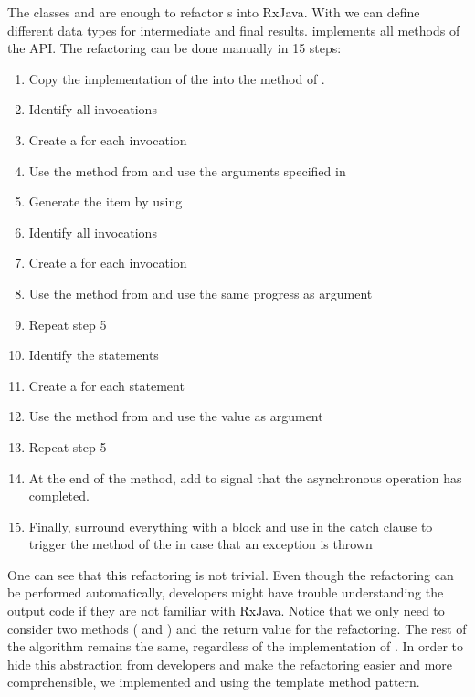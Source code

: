 \documentclass[type=bsc,accentcolor=tud9c]{tudthesis}
\newcommand{\framework}[1]{\textcolor{black}{#1}}
\begin{document}
The classes  and  are enough to refactor s into \framework{RxJava}. With  we can define different data types for intermediate and final results.  implements all methods of the  API. The refactoring can be done manually in 15 steps:
\begin{enumerate}
	\item Copy the  implementation of the  into the  method of .
	\item Identify all  invocations
	\item Create a  for each  invocation
	\item Use the method  from  and use the arguments specified in 
	\item Generate the item by using 
	\item Identify all  invocations
	\item Create a  for each  invocation
	\item Use the method  from  and use the same progress as argument
	\item Repeat step 5
	\item Identify the  statements
	\item Create a  for each  statement
	\item Use the method  from  and use the  value as argument
	\item Repeat step 5
	\item At the end of the  method, add  to signal that the asynchronous operation has completed.
	\item Finally, surround everything with a  block and use  in the catch clause to trigger the  method of the  in case that an exception is thrown
\end{enumerate}

One can see that this refactoring is not trivial. Even though the refactoring can be performed automatically, developers might have trouble understanding the output code if they are not familiar with \framework{RxJava}. Notice that we only need to consider two methods ( and ) and the return value for the refactoring. The rest of the algorithm remains the same, regardless of the implementation of . In order to hide this abstraction from developers and make the refactoring easier and more comprehensible, we implemented  and  using the template method pattern. 
\end{document}
